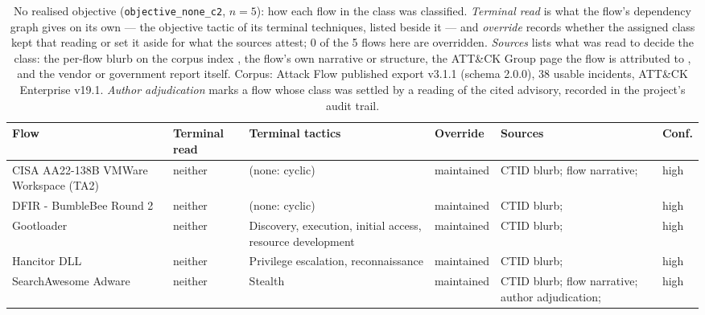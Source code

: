 \begin{table}[htbp]
\centering
\scriptsize
\setlength{\tabcolsep}{4pt}
\caption[No realised objective: per-flow classification]{No realised objective (\texttt{objective\_none\_c2}, $n=5$): how each flow in the class was classified. \emph{Terminal read} is what the flow's dependency graph gives on its own --- the objective tactic of its terminal techniques, listed beside it --- and \emph{override} records whether the assigned class kept that reading or set it aside for what the sources attest; 0 of the 5 flows here are overridden. \emph{Sources} lists what was read to decide the class: the per-flow blurb on the corpus index \citep{ctid2025attackflow}, the flow's own narrative or structure, the ATT\&CK Group page the flow is attributed to \citep{mitre2026attackv19}, and the vendor or government report itself. Corpus: Attack Flow published export v3.1.1 (schema 2.0.0), 38 usable incidents, ATT\&CK Enterprise v19.1. \emph{Author adjudication} marks a flow whose class was settled by a reading of the cited advisory, recorded in the project's audit trail.}
\label{tab:objective-audit-none-c2}
\begin{tabular}{@{}A{0.175\textwidth}A{0.100\textwidth}A{0.245\textwidth}A{0.100\textwidth}A{0.225\textwidth}A{0.045\textwidth}@{}}
\toprule
Flow & Terminal read & Terminal tactics & Override & Sources & Conf. \\
\midrule
CISA AA22-138B VMWare Workspace (TA2) & neither & (none: cyclic) & maintained & CTID blurb; flow narrative; \citep{cisaaa22138b} & high \\
DFIR - BumbleBee Round 2 & neither & (none: cyclic) & maintained & CTID blurb; \citep{dfirbumblebee2022} & high \\
Gootloader & neither & Discovery, execution, initial access, resource development & maintained & CTID blurb; \citep{dfirgootloader2022} & high \\
Hancitor DLL & neither & Privilege escalation, reconnaissance & maintained & CTID blurb; \citep{dfirdomainadmin2021} & high \\
SearchAwesome Adware & neither & Stealth & maintained & CTID blurb; flow narrative; author adjudication; \citep{malwarebytesadware2018} & high \\
\bottomrule
\end{tabular}
\end{table}
